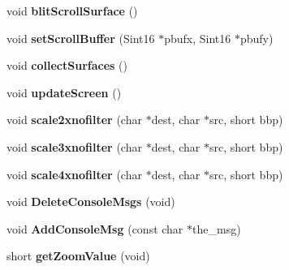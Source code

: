 \begin{DoxyCompactItemize}
\item 
\hypertarget{class_c_video_driver_a6ee22345cc64c5946f81fa53b6897abe}{
void {\bfseries blitScrollSurface} ()}
\label{class_c_video_driver_a6ee22345cc64c5946f81fa53b6897abe}

\item 
\hypertarget{class_c_video_driver_a375642525b025af9b8e5cc65bbae5051}{
void {\bfseries setScrollBuffer} (Sint16 $\ast$pbufx, Sint16 $\ast$pbufy)}
\label{class_c_video_driver_a375642525b025af9b8e5cc65bbae5051}

\item 
\hypertarget{class_c_video_driver_a5b24f52b657007464a2a876d671ebd61}{
void {\bfseries collectSurfaces} ()}
\label{class_c_video_driver_a5b24f52b657007464a2a876d671ebd61}

\item 
\hypertarget{class_c_video_driver_a878ab474c90f8536e53907d60b774b63}{
void {\bfseries updateScreen} ()}
\label{class_c_video_driver_a878ab474c90f8536e53907d60b774b63}

\item 
\hypertarget{class_c_video_driver_aaaacaf49b39bcec86bf93251fde4f0d6}{
void {\bfseries scale2xnofilter} (char $\ast$dest, char $\ast$src, short bbp)}
\label{class_c_video_driver_aaaacaf49b39bcec86bf93251fde4f0d6}

\item 
\hypertarget{class_c_video_driver_a5c99a6c68bda2f52b3e519de1d12fe3c}{
void {\bfseries scale3xnofilter} (char $\ast$dest, char $\ast$src, short bbp)}
\label{class_c_video_driver_a5c99a6c68bda2f52b3e519de1d12fe3c}

\item 
\hypertarget{class_c_video_driver_a40b6518b475cfe9253ba66b4c5be466d}{
void {\bfseries scale4xnofilter} (char $\ast$dest, char $\ast$src, short bbp)}
\label{class_c_video_driver_a40b6518b475cfe9253ba66b4c5be466d}

\item 
\hypertarget{class_c_video_driver_a1a2931ed20e177689f9a0e39dfeed57f}{
void {\bfseries DeleteConsoleMsgs} (void)}
\label{class_c_video_driver_a1a2931ed20e177689f9a0e39dfeed57f}

\item 
\hypertarget{class_c_video_driver_a35b25c4d12b314ef78dc18bfa8cd1206}{
void {\bfseries AddConsoleMsg} (const char $\ast$the\_\-msg)}
\label{class_c_video_driver_a35b25c4d12b314ef78dc18bfa8cd1206}

\item 
\hypertarget{class_c_video_driver_a184c4112d53617f0dbfd965eb3036a20}{
short {\bfseries getZoomValue} (void)}
\label{class_c_video_driver_a184c4112d53617f0dbfd965eb3036a20}


\end{DoxyCompactItemize}
